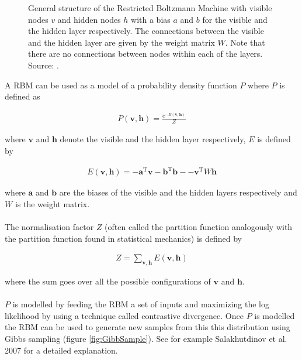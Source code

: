 \documentclass[10 pt, a4paper]{article}
\begin{document}
\begin{figure}[H] 
\centering
{}
\caption{General structure of the Restricted Boltzmann Machine with visible nodes $v$ and hidden nodes $h$ with a bias $a$ and $b$ for the visible and the hidden layer respectively. The connections between the visible and the hidden layer are given by the weight matrix $W$. Note that there are no connections between nodes within each of the layers. Source: \cite{RBM}. }
\label{fig:RBM}
\end{figure}

\newpage

A RBM can be used as a model of a probability density function $P$ where $P$ is defined as

\begin{align}
P(\mathbf{v},\mathbf{h}) = \frac{e^{-E(\mathbf{v},\mathbf{h})}}{Z}
\end{align}

where $\mathbf{v}$ and $\mathbf{h}$ denote the visible and the hidden layer respectively, $E$ is defined by

\begin{align*}
E(\mathbf{v},\mathbf{h}) = -\mathbf{a}^{\mathrm{T}} \mathbf{v} -\mathbf{b}^{\mathrm{T}} \mathbf{b} - -\mathbf{v}^{\mathrm{T}} W \mathbf{h}
\end{align*}

where $\mathbf{a}$ and $\mathbf{b}$ are the biases of the visible and the hidden layers respectively and $W$ is the weight matrix.
\\
\\
The normalisation factor $Z$ (often called the partition function analogously with the partition function found in statistical mechanics) is defined by

\begin{align*}
Z = \sum_{\mathbf{v},\mathbf{h}} E(\mathbf{v},\mathbf{h})
\end{align*}

where the sum goes over all the possible configurations of $\mathbf{v}$ and $\mathbf{h}$.
\\
\\
$P$ is modelled by feeding the RBM a set of inputs and maximizing the log likelihood by using a technique called contrastive divergence. Once $P$ is modelled the RBM can be used to generate new samples from this this distribution using Gibbs sampling (figure \ref{fig:GibbSample}). See for example Salakhutdinov et al. 2007 \cite{RBMpaper} for a detailed explanation.
\end{document}
